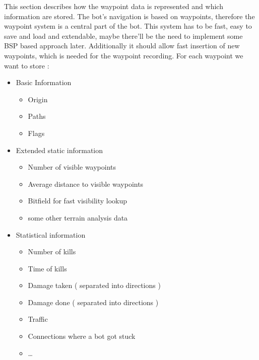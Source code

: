 \documentclass[12pt]{article}
\begin{document}
This section describes how the waypoint data is represented and which information are stored.
The bot's navigation is based on waypoints, therefore the waypoint system is a central part of the bot. This system has to be fast, easy to save and load and extendable, maybe there'll be the need to implement some BSP based approach later. Additionally it should allow fast insertion of new waypoints, which is needed for the waypoint recording. For each waypoint we want to store :
\begin {itemize}
	\item Basic Information
		\begin {itemize}
			\item Origin
			\item Paths
			\item Flags
		\end {itemize}
	\item Extended static information
		\begin {itemize}
			\item Number of visible waypoints
			\item Average distance to visible waypoints
			\item Bitfield for fast visibility lookup
			\item some other terrain analysis data
		\end {itemize}
	\item Statistical information
		\begin {itemize}
			\item Number of kills
			\item Time of kills
			\item Damage taken ( separated into directions )
			\item Damage done ( separated into directions )
			\item Traffic
			\item Connections where a bot got stuck
			\item \ldots
		\end {itemize}
\end {itemize}
\end{document}

